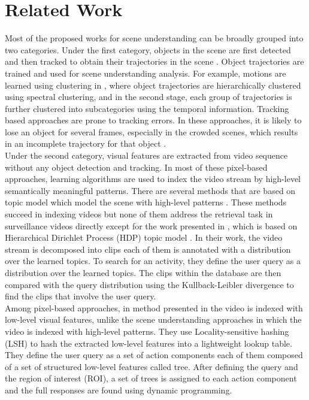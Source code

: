 \section{Related Work}
\label{subsec:relatedWorks}
\indent Most of the proposed works for scene understanding can be broadly grouped into two categories. Under the first category, objects in the scene are first detected and then tracked to obtain their trajectories in the scene  \cite{ref_17, ref_18}. Object trajectories are trained and used for scene understanding analysis. For example, motions are learned using clustering in \cite{ref_17}, where object trajectories are hierarchically clustered using spectral clustering, and in the second stage, each group of trajectories is further clustered into subcategories using the temporal information. Tracking based approaches are prone to tracking errors. In these approaches, it is likely to lose an object for several frames, especially in the crowded scenes, which results in an incomplete trajectory for that object \cite{ref_7}.\\ 
%
\indent Under the second category, visual features are extracted from video sequence without any object detection and tracking. In most of these pixel-based approaches, learning algorithms are used to index the video stream by high-level semantically meaningful patterns. There are several methods that are based on topic model which model the scene with high-level patterns \cite{ref_7,ref_9,ref_15,ref_16}. These methods succeed in indexing videos but none of them address the retrieval task in surveillance videos directly except for the work presented in \cite{ref_7}, which is based on Hierarchical Dirichlet Process (HDP) topic model \cite{ref_21}. In their work, the video stream is decomposed into clips each of them is annotated with a distribution over the learned topics. To search for an activity, they define the user query as a distribution over the learned topics. The clips within the database are then compared with the query distribution using the Kullback-Leibler divergence to find the clips that involve the user query. \\
%
\indent  Among pixel-based approaches, in method presented in the video is indexed with low-level visual features, unlike the scene understanding approaches in which the video is indexed with high-level patterns. They use Locality-sensitive hashing (LSH) to hash the extracted low-level features into a lightweight lookup table. They define the user query as a set of action components each of them composed of a set of structured low-level features called tree. After defining the query and the region of interest (ROI), a set of trees is assigned to each action component and the full responses are found using dynamic programming. 
